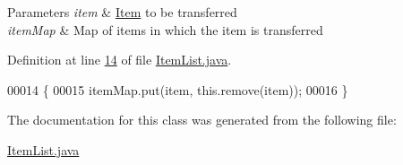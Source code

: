 \begin{DoxyParams}{Parameters}
{\em item} & \hyperlink{classItem}{Item} to be transferred \\
\hline
{\em item\-Map} & Map of items in which the item is transferred \\
\hline
\end{DoxyParams}


Definition at line \hyperlink{ItemList_8java_source_l00014}{14} of file \hyperlink{ItemList_8java_source}{Item\-List.\-java}.


\begin{DoxyCode}
00014                                                                      \{
00015         itemMap.put(item, this.remove(item));
00016     \}
\end{DoxyCode}


The documentation for this class was generated from the following file\-:\begin{DoxyCompactItemize}
\item 
\hyperlink{ItemList_8java}{Item\-List.\-java}\end{DoxyCompactItemize}
